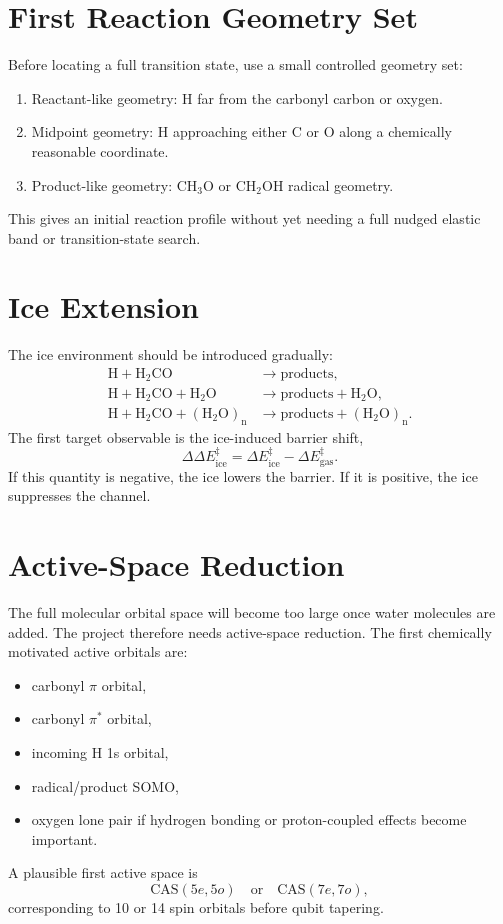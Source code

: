 \documentclass[11pt]{article}
\begin{document}
\section{First Reaction Geometry Set}

Before locating a full transition state, use a small controlled geometry set:
\begin{enumerate}[leftmargin=*]
  \item Reactant-like geometry: H far from the carbonyl carbon or oxygen.
  \item Midpoint geometry: H approaching either C or O along a chemically reasonable coordinate.
  \item Product-like geometry: CH$_3$O or CH$_2$OH radical geometry.
\end{enumerate}
This gives an initial reaction profile without yet needing a full nudged elastic band or transition-state search.

\section{Ice Extension}

The ice environment should be introduced gradually:
\begin{align}
  \mathrm{H + H_2CO}
  &\rightarrow
  \mathrm{products}, \\
  \mathrm{H + H_2CO + H_2O}
  &\rightarrow
  \mathrm{products + H_2O}, \\
  \mathrm{H + H_2CO + (H_2O)_n}
  &\rightarrow
  \mathrm{products + (H_2O)_n}.
\end{align}
The first target observable is the ice-induced barrier shift,
\begin{equation}
  \Delta\Delta E^\ddagger_{\mathrm{ice}}
  =
  \Delta E^\ddagger_{\mathrm{ice}}
  -
  \Delta E^\ddagger_{\mathrm{gas}}.
\end{equation}
If this quantity is negative, the ice lowers the barrier. If it is positive, the ice suppresses the channel.

\section{Active-Space Reduction}

The full molecular orbital space will become too large once water molecules are added. The project
therefore needs active-space reduction. The first chemically motivated active orbitals are:
\begin{itemize}[leftmargin=*]
  \item carbonyl $\pi$ orbital,
  \item carbonyl $\pi^\ast$ orbital,
  \item incoming H 1s orbital,
  \item radical/product SOMO,
  \item oxygen lone pair if hydrogen bonding or proton-coupled effects become important.
\end{itemize}
A plausible first active space is
\begin{equation}
  \mathrm{CAS}(5e,5o)
  \quad \mathrm{or} \quad
  \mathrm{CAS}(7e,7o),
\end{equation}
corresponding to 10 or 14 spin orbitals before qubit tapering.
\end{document}
